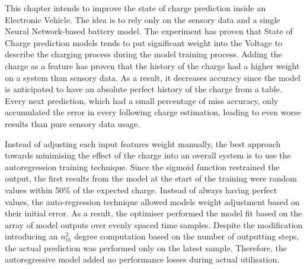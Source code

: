 This chapter intends to improve the state of charge prediction inside an Electronic Vehicle.
The idea is to rely only on the sensory data and a single Neural Network-based battery model.
The experiment has proven that State of Charge prediction models tends to put significant weight into the Voltage to describe the charging process during the model training process.
Adding the charge as a feature has proven that the history of the charge had a higher weight on a system than sensory data.
As a result, it decreases accuracy since the model is anticipated to have an absolute perfect history of the charge from a table.
Every next prediction, which had a small percentage of miss accuracy, only accumulated the error in every following charge estimation, leading to even worse results than pure sensory data usage.

%
%
Instead of adjusting each input features weight manually, the best approach towards minimising the effect of the charge into an overall system is to use the autoregression training technique. 
Since the sigmoid function restrained the output, the first results from the model at the start of the training were random values within 50\% of the expected charge.
Instead of always having perfect values, the auto-regression technique allowed models weight adjustment based on their initial error.
As a result, the optimiser performed the model fit based on the array of model outputs over evenly spaced time samples.
Despite the modification introducing an $n_{th}^{2}$ degree computation based on the number of outputting steps, the actual prediction was performed only on the latest sample.
Therefore, the autoregressive model added no performance losses during actual utilisation. 
    

